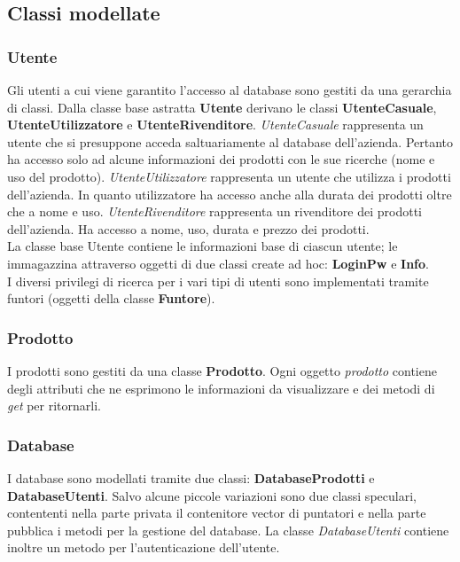 \documentclass[a4paper,10pt] {article}
\begin{document}
\subsection{Classi modellate}
\subsubsection{Utente}
Gli utenti a cui viene garantito l'accesso al database sono gestiti da una 
gerarchia di classi. Dalla classe base astratta \textbf{Utente} derivano le 
classi 
\textbf{UtenteCasuale}, \textbf{UtenteUtilizzatore} e 
\textbf{UtenteRivenditore}. \textsl{UtenteCasuale} rappresenta un utente che si 
presuppone acceda saltuariamente al
database dell'azienda. Pertanto ha accesso solo ad alcune informazioni dei 
prodotti con le sue ricerche (nome e uso del prodotto). 
\textsl{UtenteUtilizzatore} rappresenta
un utente che utilizza i prodotti dell'azienda. In quanto utilizzatore ha 
accesso anche alla durata dei prodotti oltre che a nome e uso. 
\textsl{UtenteRivenditore}
rappresenta un rivenditore dei prodotti dell'azienda. Ha accesso a nome, uso, 
durata e prezzo dei prodotti.\\
La classe base Utente contiene le informazioni base di ciascun utente; le 
immagazzina attraverso oggetti di due classi create ad hoc: \textbf{LoginPw} e 
\textbf{Info}.\\
I diversi privilegi di ricerca per i vari tipi di utenti sono implementati 
tramite funtori (oggetti della classe \textbf{Funtore}).

\subsubsection{Prodotto}
I prodotti sono gestiti da una classe \textbf{Prodotto}. Ogni oggetto 
\textsl{prodotto} contiene degli attributi che ne esprimono le informazioni da 
visualizzare e dei metodi di \textsl{get} per ritornarli.

\subsubsection{Database}
I database sono modellati tramite due classi: \textbf{DatabaseProdotti} e 
\textbf{DatabaseUtenti}. Salvo alcune piccole variazioni sono due classi 
speculari, contententi nella
parte privata il contenitore vector di puntatori e nella parte pubblica i metodi 
per la gestione del database. La classe \textsl{DatabaseUtenti} contiene inoltre 
un metodo
per l'autenticazione dell'utente.
\end{document}
